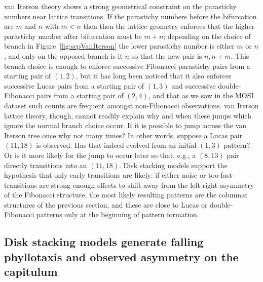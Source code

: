 \documentclass[a4paper,10pt]{amsart}
\begin{document}
van Iterson theory shows a strong geometrical constraint on the parastichy numbers near lattice transitions. If the parastichy numbers before the bifurcation are $m$ and $n$ with $m<n$ then then the lattice geometry enforces that the higher parastichy number after bifurcation must be $m+n$; depending on the choice of branch in Figure~\ref{fig:scpVanIterson} the lower parastichy number is either $m$ or $n$, and only on the opposed branch is it $n$ so that the new pair is $n,n+m$. This branch choice is enough to enforce successive Fibonacci parastichy pairs from a starting pair of $(1,2)$, but it has long  been noticed that it also enforces successive Lucas pairs from a starting pair of $(1,3)$ and successive double-Fibonacci pairs from a starting pair of $(2,4)$, and that as we saw in the MOSI dataset such counts are frequent amongst non-Fibonacci observations. van Iterson lattice theory, though, cannot readily explain why and when these jumps which  ignore the normal branch choice occur.  If  it is possible to jump across the van Iterson tree once why not many times? In other words, suppose a Lucas pair $(11,18)$ is observed. Has that indeed evolved from an initial $(1,3)$ pattern? Or is it more likely for the jump to occur later so that, e.g., a $(8,13)$ pair directly transitions into an $(11,18)$. 
Disk stacking models support the hypothesis that only early transitions are likely: if either noise or too-fast transitions are strong enough effects to shift away from the left-right asymmetry of the  Fibonacci structure, the most likely resulting patterns are the columnar structures of the previous section, and these are close to Lucas or double-Fibonacci patterns only at the beginning of pattern formation. 


\subsection{Disk stacking models generate falling phyllotaxis and observed asymmetry on the capitulum}
\end{document}
